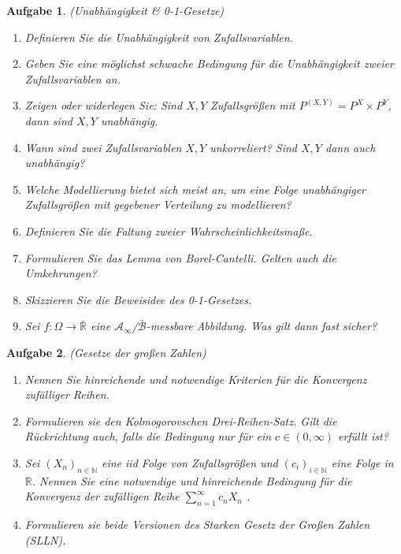 \documentclass[11pt, a4paper, ngerman]{article}
\newcommand{\N}{\mathbb{N}}
\newcommand{\R}{\mathbb{R}}
\newtheorem{aufgabe}{Aufgabe}
\begin{document}
\begin{aufgabe} (Unabhängigkeit \& 0-1-Gesetze)
   \begin{enumerate}
        \item 
        Definieren Sie die Unabhängigkeit von Zufallsvariablen.
        \item 
        Geben Sie eine möglichst schwache Bedingung für die Unabhängigkeit zweier Zufallsvariablen an. 
        \item 
        Zeigen oder widerlegen Sie: Sind $X,Y$ Zufallsgrößen mit  $P^{(X,Y)} = P^X \times P^Y$, dann sind $X,Y$ unabhängig. 
        \item 
        Wann sind zwei Zufallsvariablen $X,Y$ unkorreliert? Sind $X,Y$ dann auch unabhängig? 
        \item 
        Welche Modellierung bietet sich meist an, um eine Folge unabhängiger Zufallsgrößen mit gegebener Verteilung zu modellieren? 
        \item 
        Definieren Sie die Faltung zweier Wahrscheinlichkeitsmaße. 
        \item   
        Formulieren Sie das Lemma von Borel-Cantelli. Gelten auch die Umkehrungen? 
        \item 
        Skizzieren Sie die Beweisidee des 0-1-Gesetzes. 
        \item 
        Sei $f: \Omega \to \bar{\R}$ eine $\mathcal{A}_{\infty}$/$\bar{\mathcal{B}}$-messbare Abbildung. Was gilt dann fast sicher? 
    \end{enumerate}
    
\end{aufgabe}

\begin{aufgabe} (Gesetze der großen Zahlen)
    \begin{enumerate}
        \item 
        Nennen Sie hinreichende und notwendige Kriterien für die Konvergenz zufälliger Reihen. 
        \item
        Formulieren sie den Kolmogorovschen Drei-Reihen-Satz. Gilt die Rückrichtung auch, falls die Bedingung nur für ein $c \in (0, \infty)$ erfüllt ist?
        \item 
        Sei $(X_n)_{n \in \N}$ eine iid Folge von Zufallsgrößen und $(c_i)_{i \in \N}$ eine Folge in $\R$. 
        Nennen Sie eine notwendige und hinreichende Bedingung für die Konvergenz der zufälligen Reihe $\sum_{n=1}^{\infty} c_n X_n$ .  
        \item 
        Formulieren sie beide Versionen des Starken Gesetz der Großen Zahlen (SLLN).
    \end{enumerate} 
\end{aufgabe}
\end{document}
